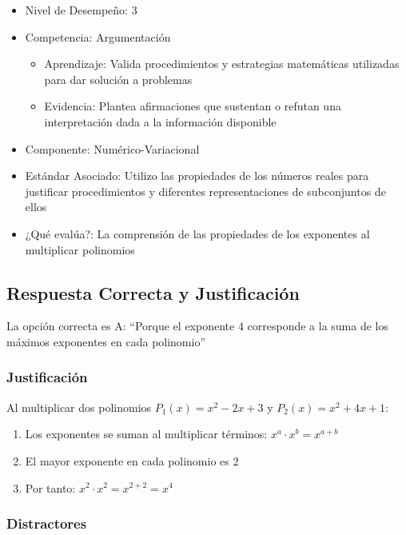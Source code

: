 \documentclass[
]{article}
\providecommand{\tightlist}{%
  \setlength{\itemsep}{0pt}\setlength{\parskip}{0pt}}
\begin{document}
\begin{itemize}
\tightlist
\item
  Nivel de Desempeño: 3
\item
  Competencia: Argumentación

  \begin{itemize}
  \tightlist
  \item
    Aprendizaje: Valida procedimientos y estrategias matemáticas
    utilizadas para dar solución a problemas
  \item
    Evidencia: Plantea afirmaciones que sustentan o refutan una
    interpretación dada a la información disponible
  \end{itemize}
\item
  Componente: Numérico-Variacional
\item
  Estándar Asociado: Utilizo las propiedades de los números reales para
  justificar procedimientos y diferentes representaciones de
  subconjuntos de ellos
\item
  ¿Qué evalúa?: La comprensión de las propiedades de los exponentes al
  multiplicar polinomios
\end{itemize}

\subsection{Respuesta Correcta y
Justificación}\label{respuesta-correcta-y-justificaciuxf3n-1}

La opción correcta es A: ``Porque el exponente 4 corresponde a la suma
de los máximos exponentes en cada polinomio''

\subsubsection{Justificación}\label{justificaciuxf3n-8}

Al multiplicar dos polinomios \(P_1(x) = x^2 - 2x + 3\) y
\(P_2(x) = x^2 + 4x + 1\):

\begin{enumerate}
\def\labelenumi{\arabic{enumi})}
\tightlist
\item
  Los exponentes se suman al multiplicar términos:
  \(x^a \cdot x^b = x^{a+b}\)
\item
  El mayor exponente en cada polinomio es 2
\item
  Por tanto: \(x^2 \cdot x^2 = x^{2+2} = x^4\)
\end{enumerate}

\subsubsection{Distractores}\label{distractores-4}
\end{document}
